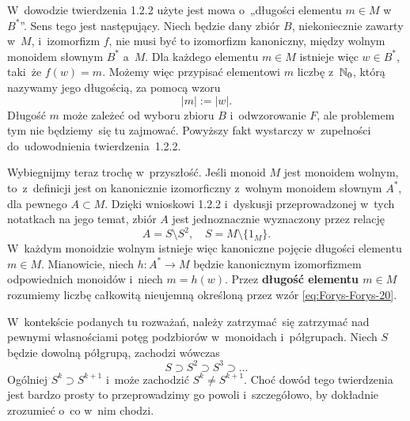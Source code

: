 \documentclass[a4paper,11pt]{article}
\begin{document}
\vspace{\spaceFour}





 W~dowodzie twierdzenia 1.2.2 użyte jest mowa o~„długości elementu
$m \in M$ w~$B^{ * }$”. Sens tego jest następujący. Niech będzie dany zbiór
$B$, niekoniecznie zawarty w~$M$, i~izomorfizm $f$, nie musi być to
izomorfizm kanoniczny, między wolnym monoidem słownym $B^{ * }$ a~$M$.
Dla każdego elementu $m \in M$ istnieje więc $w \in B^{ * }$, taki~że
$f( w ) = m$. Możemy więc przypisać elementowi $m$ liczbę z~$\mathbb{N}_{ 0 }$,
którą nazywamy jego długością, za pomocą wzoru
\begin{equation}
  \label{eq:Forys-Forys-24}
  | m | := | w |.
\end{equation}
Długość $m$ może zależeć od wyboru zbioru $B$ i~odwzorowanie $F$, ale
problemem tym nie będziemy~się tu zajmować. Powyższy fakt wystarczy
w~zupełności do~udowodnienia twierdzenia~1.2.2.

Wybiegnijmy teraz trochę w~przyszłość. Jeśli monoid $M$ jest monoidem
wolnym, to~z~definicji jest on kanonicznie izomorficzny z~wolnym
monoidem słownym $A^{ * }$, dla pewnego $A \subset M$. Dzięki
wnioskowi 1.2.2 i~dyskusji przeprowadzonej w~tych notatkach na jego
temat, zbiór $A$ jest jednoznacznie wyznaczony przez relację
\begin{equation}
  \label{eq:Forys-Forys-25}
  A = S \setminus S^{ 2 }, \quad
  S = M \setminus \{ 1_{ M } \}.
\end{equation}
W~każdym monoidzie wolnym istnieje więc kanoniczne pojęcie długości
elementu $m \in M$. Mianowicie, niech $h : A^{ * } \to M$ będzie
kanonicznym izomorfizmem odpowiednich monoidów i~niech $m = h( w )$.
Przez \textbf{długość elementu $m \in M$} rozumiemy liczbę całkowitą
nieujemną określoną przez wzór \eqref{eq:Forys-Forys-20}.

\vspace{\spaceFour}





 W~kontekście podanych tu rozważań, należy zatrzymać~się
zatrzymać nad pewnymi własnościami potęg podzbiorów w~monoidach
i~półgrupach. Niech $S$ będzie dowolną półgrupą, zachodzi wówczas
\begin{equation}
  \label{eq:Forys-Forys-26}
  S \supset S^{ 2 } \supset S^{ 3 } \supset \ldots
\end{equation}
Ogólniej $S^{ k } \supset S^{ k + 1 }$ i~może zachodzić
$S^{ k } \neq S^{ k + 1 }$. Choć dowód tego twierdzenia jest bardzo
prosty to przeprowadzimy go powoli i~szczegółowo, by dokładnie
zrozumieć o~co w~nim chodzi.
\end{document}
